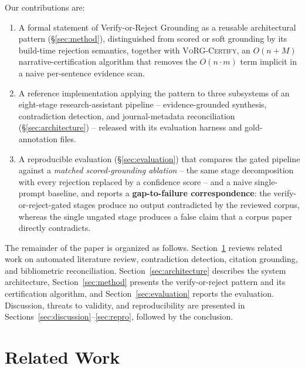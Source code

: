 \documentclass[11pt]{article}
\begin{document}
Our contributions are:
\begin{enumerate}
 \item A formal statement of Verify-or-Reject Grounding as a reusable
 architectural pattern (\S\ref{sec:method}), distinguished from scored or soft
 grounding by its build-time rejection semantics, together with
 \textsc{VoRG-Certify}, an $O(n+M)$ narrative-certification algorithm that
 removes the $O(n\cdot m)$ term implicit in a naive per-sentence evidence scan.

 \item A reference implementation applying the pattern to three subsystems of an
 eight-stage research-assistant pipeline -- evidence-grounded synthesis,
 contradiction detection, and journal-metadata reconciliation
 (\S\ref{sec:architecture}) -- released with its evaluation harness and
 gold-annotation files.

 \item A reproducible evaluation (\S\ref{sec:evaluation}) that compares the
 gated pipeline against a \emph{matched scored-grounding ablation} -- the same
 stage decomposition with every rejection replaced by a confidence score -- and
 a naive single-prompt baseline, and reports a \textbf{gap-to-failure
 correspondence}: the verify-or-reject-gated stages produce no output
 contradicted by the reviewed corpus, whereas the single ungated stage produces
 a false claim that a corpus paper directly contradicts.
\end{enumerate}

The remainder of the paper is organized as follows.
Section~\ref{sec:related} reviews related work on automated literature review,
contradiction detection, citation grounding, and bibliometric reconciliation.
Section~\ref{sec:architecture} describes the system architecture,
Section~\ref{sec:method} presents the verify-or-reject pattern and its
certification algorithm, and Section~\ref{sec:evaluation} reports the
evaluation. Discussion, threats to validity, and reproducibility are presented
in Sections~\ref{sec:discussion}--\ref{sec:repro}, followed by the conclusion.

\section{Related Work}
\label{sec:related}
\end{document}

